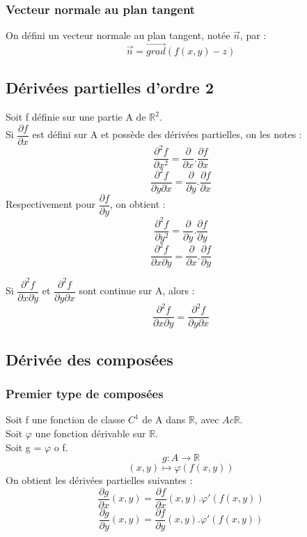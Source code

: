 \subsubsection{Vecteur normale au plan tangent}
\begin{de}
On défini un vecteur normale au plan tangent, notée $\overrightarrow{n}$, par :
$$\overrightarrow{n} = \overrightarrow{grad}(f(x,y)-z)$$
\end{de}
\subsection{Dérivées partielles d'ordre 2}
\begin{de}
Soit f définie sur une partie A de $\mathbb{R}^2$.\\
Si $\dfrac{\partial f}{\partial x}$ est défini sur A et possède des dérivées partielles, on les notes : 
$$\dfrac{\partial^2f}{\partial x^2} = \dfrac{\partial}{\partial x}.\dfrac{\partial f}{\partial x}$$
$$\dfrac{\partial^2f}{\partial y \partial x} = \dfrac{\partial}{\partial y}.\dfrac{\partial f}{\partial x}$$
Respectivement pour $\dfrac{\partial f}{\partial y}$, on obtient :
$$\dfrac{\partial^2f}{\partial y^2} = \dfrac{\partial}{\partial y}.\dfrac{\partial f}{\partial y}$$
$$\dfrac{\partial^2f}{\partial x \partial y} = \dfrac{\partial}{\partial x}.\dfrac{\partial f}{\partial y}$$
\end{de}
\begin{theo}
Si $\dfrac{\partial^2f}{\partial x \partial y}$ et $\dfrac{\partial^2f}{\partial y \partial x}$ sont continue sur A, alors : 
$$\dfrac{\partial^2f}{\partial x \partial y} = \dfrac{\partial^2f}{\partial y \partial x}$$
\end{theo}
\subsection{Dérivée des composées}
\subsubsection{Premier type de composées}
Soit f une fonction de classe $C^1$ de A dans $\mathbb{R}$, avec $A c \mathbb{R}$.\\
Soit $\varphi$ une fonction dérivable sur $\mathbb{R}$.\\
Soit g = $\varphi$ o f.
$$g : A \rightarrow \mathbb{R}$$
$$(x,y) \mapsto \varphi(f(x,y))$$
On obtient les dérivées partielles suivantes : 
$$\dfrac{\partial g}{\partial x}(x,y) = \dfrac{\partial f}{\partial x}(x,y).\varphi'(f(x,y))$$
$$\dfrac{\partial g}{\partial y}(x,y) = \dfrac{\partial f}{\partial y}(x,y).\varphi'(f(x,y))$$
